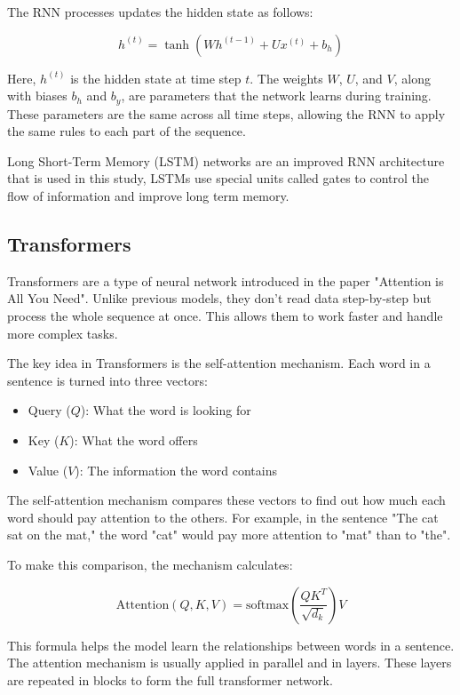 \documentclass[11pt]{article}
\begin{document}
The RNN processes updates the hidden state as follows:

\begin{equation}
h^{(t)} = \tanh(Wh^{(t-1)} + Ux^{(t)} + b_h)
\end{equation}

Here, \(h^{(t)}\) is the hidden state at time step \(t\). The weights \(W\), \(U\), and \(V\), along with biases \(b_h\) and \(b_y\), are parameters that the network learns during training. These parameters are the same across all time steps, allowing the RNN to apply the same rules to each part of the sequence.

Long Short-Term Memory (LSTM) networks are an improved RNN architecture that is used in this study,  LSTMs use special units called gates to control the flow of information and improve long term memory.


\subsection{Transformers}
Transformers are a type of neural network introduced in the paper "Attention is All You Need". Unlike previous models, they don't read data step-by-step but process the whole sequence at once. This allows them to work faster and handle more complex tasks.

The key idea in Transformers is the self-attention mechanism. Each word in a sentence is turned into three vectors: 
\begin{itemize}
    \item Query ($Q$): What the word is looking for
    \item Key ($K$): What the word offers
    \item Value ($V$): The information the word contains
\end{itemize}

The self-attention mechanism compares these vectors to find out how much each word should pay attention to the others. For example, in the sentence "The cat sat on the mat," the word "cat" would pay more attention to "mat" than to "the".

To make this comparison, the mechanism calculates:

\[
\text{Attention}(Q, K, V) = \text{softmax}\left(\frac{QK^T}{\sqrt{d_k}}\right)V
\]

This formula helps the model learn the relationships between words in a sentence. The attention mechanism is usually applied in parallel and in layers. These layers are repeated in blocks to form the full transformer network. 
\end{document}
